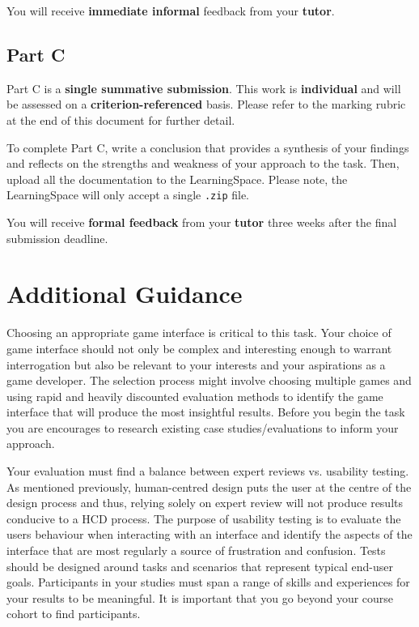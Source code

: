 \documentclass{../fal_assignment}
\begin{document}
You will receive \textbf{immediate informal} feedback from your \textbf{tutor}.

\subsection*{Part C}

Part C is a \textbf{single summative submission}. This work is \textbf{individual} and will be assessed on a \textbf{criterion-referenced} basis. Please refer to the marking rubric at the end of this document for further detail.

To complete Part C, write a conclusion that provides a synthesis  of your findings and reflects on the strengths and weakness of your approach to the task. Then, upload all the documentation to the LearningSpace. Please note, the LearningSpace will only accept a single \texttt{.zip} file.

You will receive \textbf{formal feedback} from your \textbf{tutor} three weeks after the final submission deadline.

\section*{Additional Guidance}
Choosing an appropriate game interface is critical to this task. Your choice of game interface should not only be complex and interesting enough to warrant interrogation but also be relevant to your interests and your aspirations as a game developer. The selection process might involve choosing multiple games and using rapid and heavily discounted evaluation methods to identify the game interface that will produce the most insightful results. Before you begin the task you are encourages to research existing case studies/evaluations to inform your approach. 

Your evaluation must find a balance between expert reviews vs. usability testing. As mentioned previously, human-centred design puts the user at the centre of the design process and thus, relying solely on expert review will not produce results conducive to a HCD process. The purpose of usability testing is to evaluate the users behaviour when interacting with an interface and identify the aspects of the interface that are most regularly a source of frustration and confusion. Tests should be designed around tasks and scenarios that represent typical end-user goals. Participants in your studies must span a range of skills and experiences for your results to be meaningful. It is important that you go beyond your course cohort to find participants. 
\end{document}
